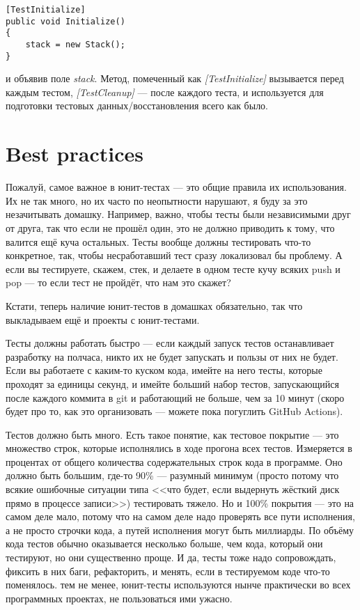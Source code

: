 \documentclass{../../text-style}
\begin{document}
\begin{verbatim}
[TestInitialize]
public void Initialize()
{
    stack = new Stack();
}
\end{verbatim}

и объявив поле \textit{stack}. Метод, помеченный как \textit{[TestInitialize]} вызывается перед каждым тестом, \textit{[TestCleanup]} --- после каждого теста, и используется для подготовки тестовых данных/восстановления всего как было. 

\section{Best practices}

Пожалуй, самое важное в юнит-тестах --- это общие правила их использования. Их не так много, но их часто по неопытности нарушают, я буду за это незачитывать домашку. Например, важно, чтобы тесты были независимыми друг от друга, так что если не прошёл один, это не должно приводить к тому, что валится ещё куча остальных. Тесты вообще должны тестировать что-то конкретное, так, чтобы несработавший тест сразу локализовал бы проблему. А если вы тестируете, скажем, стек, и делаете в одном тесте кучу всяких push и pop --- то если тест не пройдёт, что нам это скажет?

Кстати, теперь наличие юнит-тестов в домашках обязательно, так что выкладываем ещё и проекты с юнит-тестами.

Тесты должны работать быстро --- если каждый запуск тестов останавливает разработку на полчаса, никто их не будет запускать и пользы от них не будет. Если вы работаете с каким-то куском кода, имейте на него тесты, которые проходят за единицы секунд, и имейте больший набор тестов, запускающийся после каждого коммита в git и работающий не больше, чем за 10 минут (скоро будет про то, как это организовать --- можете пока погуглить GitHub Actions).

Тестов должно быть много. Есть такое понятие, как тестовое покрытие --- это множество строк, которые исполнялись в ходе прогона всех тестов. Измеряется в процентах от общего количества содержательных строк кода в программе. Оно должно быть большим, где-то 90\% --- разумный минимум (просто потому что всякие ошибочные ситуации типа <<что будет, если выдернуть жёсткий диск прямо в процессе записи>>) тестировать тяжело. Но и 100\% покрытия --- это на самом деле мало, потому что на самом деле надо проверять все пути исполнения, а не просто строчки кода, а путей исполнения могут быть миллиарды. По объёму кода тестов обычно оказывается несколько больше, чем кода, который они тестируют, но они существенно проще. И да, тесты тоже надо сопровождать, фиксить в них баги, рефакторить, и менять, если в тестируемом коде что-то поменялось. тем не менее, юнит-тесты используются нынче практически во всех программных проектах, не пользоваться ими ужасно.
\end{document}
